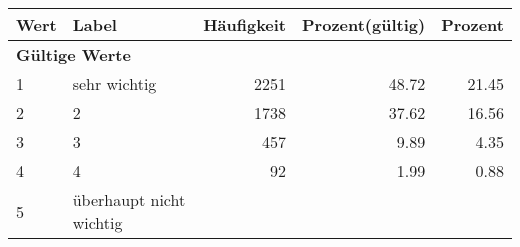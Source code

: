      \begin{longtable}{lXrrr}
     \toprule
     \textbf{Wert} & \textbf{Label} & \textbf{Häufigkeit} & \textbf{Prozent(gültig)} & \textbf{Prozent} \\
     \endhead
     \midrule
     \multicolumn{5}{l}{\textbf{Gültige Werte}}\\

     1 &
     \multicolumn{1}{X}{ sehr wichtig   } &


       \num{2251} &
       \num[round-mode=places,round-precision=2]{48.72} &
         \num[round-mode=places,round-precision=2]{21.45} \\

     2 &
     \multicolumn{1}{X}{ 2   } &


       \num{1738} &
       \num[round-mode=places,round-precision=2]{37.62} &
         \num[round-mode=places,round-precision=2]{16.56} \\

     3 &
     \multicolumn{1}{X}{ 3   } &


       \num{457} &
       \num[round-mode=places,round-precision=2]{9.89} &
         \num[round-mode=places,round-precision=2]{4.35} \\

     4 &
     \multicolumn{1}{X}{ 4   } &


       \num{92} &
       \num[round-mode=places,round-precision=2]{1.99} &
         \num[round-mode=places,round-precision=2]{0.88} \\

     5 &
     \multicolumn{1}{X}{ überhaupt nicht wichtig   } &



\end{longtable}
